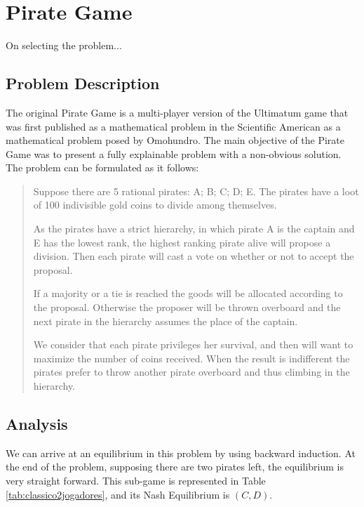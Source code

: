 


\section{Pirate Game}
\label{sec:pirate}

\begin{emph}
On selecting the problem...
\end{emph}


\subsection{Problem Description}
\label{subsec:description}

The original Pirate Game is a multi-player version of the Ultimatum game that was first published as a mathematical problem in the Scientific American as a mathematical problem posed by Omohundro\cite{Stewart1999}. The main objective of the Pirate Game was to present a fully explainable problem with a non-obvious solution. The problem can be formulated as it follows:

\begin{quotation}
Suppose there are 5 rational pirates: A; B; C; D; E. The pirates have a  loot of 100 indivisible gold coins to divide among themselves.


As the pirates have a strict hierarchy, in which pirate A is the captain and E has the lowest rank, the highest ranking pirate alive will propose a division. Then each pirate will cast a vote on whether or not to accept the proposal. 

If a majority or a tie is reached the goods will be allocated according to the proposal. Otherwise the proposer will be thrown overboard and the next pirate in the hierarchy assumes the place of the captain. 

We consider that each pirate privileges her survival, and then will want to maximize the number of coins received. When the result is indifferent the pirates prefer to throw another pirate overboard and thus climbing in the hierarchy. 
\end{quotation}

\subsection{Analysis}
\label{subsec:analysis_PG}

We can arrive at an equilibrium in this problem by using backward induction. At the end of the problem, supposing there are two pirates left, the equilibrium is very straight forward. This sub-game is represented in Table \ref{tab:classico2jogadores}, and its Nash Equilibrium is $(C,D)$.



